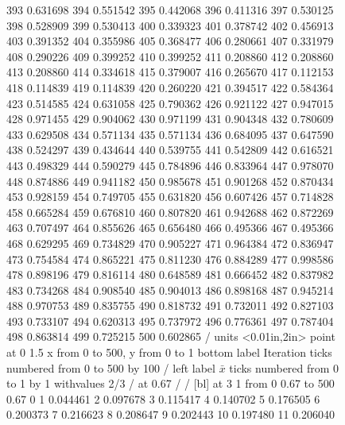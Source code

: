\begin{figure}
{    393   0.631698
    394   0.551542
    395   0.442068
    396   0.411316
    397   0.530125
    398   0.528909
    399   0.530413
    400   0.339323
    401   0.378742
    402   0.456913
    403   0.391352
    404   0.355986
    405   0.368477
    406   0.280661
    407   0.331979
    408   0.290226
    409   0.399252
    410   0.399252
    411   0.208860
    412   0.208860
    413   0.208860
    414   0.334618
    415   0.379007
    416   0.265670
    417   0.112153
    418   0.114839
    419   0.114839
    420   0.260220
    421   0.394517
    422   0.584364
    423   0.514585
    424   0.631058
    425   0.790362
    426   0.921122
    427   0.947015
    428   0.971455
    429   0.904062
    430   0.971199
    431   0.904348
    432   0.780609
    433   0.629508
    434   0.571134
    435   0.571134
    436   0.684095
    437   0.647590
    438   0.524297
    439   0.434644
    440   0.539755
    441   0.542809
    442   0.616521
    443   0.498329
    444   0.590279
    445   0.784896
    446   0.833964
    447   0.978070
    448   0.874886
    449   0.941182
    450   0.985678
    451   0.901268
    452   0.870434
    453   0.928159
    454   0.749705
    455   0.631820
    456   0.607426
    457   0.714828
    458   0.665284
    459   0.676810
    460   0.807820
    461   0.942688
    462   0.872269
    463   0.707497
    464   0.855626
    465   0.656480
    466   0.495366
    467   0.495366
    468   0.629295
    469   0.734829
    470   0.905227
    471   0.964384
    472   0.836947
    473   0.754584
    474   0.865221
    475   0.811230
    476   0.884289
    477   0.998586
    478   0.898196
    479   0.816114
    480   0.648589
    481   0.666452
    482   0.837982
    483   0.734268
    484   0.908540
    485   0.904013
    486   0.898168
    487   0.945214
    488   0.970753
    489   0.835755
    490   0.818732
    491   0.732011
    492   0.827103
    493   0.733107
    494   0.620313
    495   0.737972
    496   0.776361
    497   0.787404
    498   0.863814
    499   0.725215
    500   0.602865
/
\setcoordinatesystem units <0.01in,2in> point at 0 1.5
\setplotarea x from 0 to 500, y from 0 to 1
\axis bottom label {Iteration} ticks numbered from 0 to 500 by 100 /
\axis left label {$\bar x$} ticks numbered from 0 to 1 by 1 
         withvalues {2/3} / at 0.67 / /
 [bl] at 3 1
\setdots
\putrule from 0 0.67 to 500 0.67
\setsolid
{}        0
      1 0.044461
      2 0.097678
      3 0.115417
      4 0.140702
      5 0.176505
      6 0.200373
      7 0.216623
      8 0.208647
      9 0.202443
     10 0.197480
     11 0.206040
}
\end{figure}
